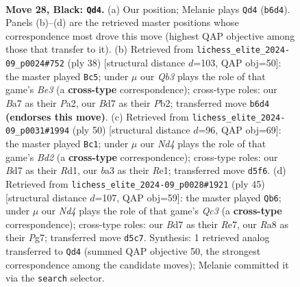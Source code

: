 \documentclass[11pt]{article}
\begin{document}
\clearpage

\begin{figure}[p]\centering
\begin{subfigure}{0.46\textwidth}\centering
\resizebox{\linewidth}{!}{%
\newchessgame
\chessboard[
  setfen={r3r2k/bp1b1pp1/pq2p3/3n3P/8/BP1p1Q1B/P2P1PKP/RN2R3 b - - 1 28},
  showmover=false,
  pgfstyle=straightmove, color=movearrow, markmove={b6-d4}
]}
\caption{}
\end{subfigure}\hfill
\begin{subfigure}{0.46\textwidth}\centering
\resizebox{\linewidth}{!}{%
\newchessgame
\chessboard[
  setfen={r1b1r3/2p1P1bk/p1p3np/5p2/6pq/2N1B3/PP1Q1PPN/R3R1K1 w - - 1 20},
  showmover=false,
  pgfstyle=straightmove, color=movearrow, markmove={e3-c5}
]}
\caption{}
\end{subfigure}
\\[4pt]
\begin{subfigure}{0.46\textwidth}\centering
\resizebox{\linewidth}{!}{%
\newchessgame
\chessboard[
  setfen={b2qk3/2p1bpr1/4pn2/p3Np1p/3P4/2P2P1Q/Pr1B2PP/3RRBK1 w - - 0 26},
  showmover=false,
  pgfstyle=straightmove, color=movearrow, markmove={d2-c1}
]}
\caption{}
\end{subfigure}\hfill
\begin{subfigure}{0.46\textwidth}\centering
\resizebox{\linewidth}{!}{%
\newchessgame
\chessboard[
  setfen={6k1/1b2r1p1/p1q1pr2/1p3nNp/1P1b4/PB5Q/2R2PPP/2B2RK1 b - - 3 23},
  showmover=false,
  pgfstyle=straightmove, color=movearrow, markmove={c6-b6}
]}
\caption{}
\end{subfigure}
\caption{\textbf{Move 28, Black: \texttt{Qd4}.} (a) Our position; Melanie plays \texttt{Qd4} (\texttt{b6d4}). Panels (b)--(d) are the retrieved master positions whose correspondence most drove this move (highest QAP objective among those that transfer to it). (b) Retrieved from \texttt{lichess\_elite\_2024-09\_p0024\#752} (ply 38) [structural distance $d$=103, QAP obj=50]: the master played \texttt{Bc5}; under $\mu$ our \emph{Qb3} plays the role of that game's \emph{Be3} (a \textbf{cross-type} correspondence); cross-type roles: our \emph{B}a7 as their \emph{P}a2, our \emph{B}d7 as their \emph{P}b2; transferred move \texttt{b6d4} \textbf{(endorses this move)}. (c) Retrieved from \texttt{lichess\_elite\_2024-09\_p0031\#1994} (ply 50) [structural distance $d$=96, QAP obj=69]: the master played \texttt{Bc1}; under $\mu$ our \emph{Nd4} plays the role of that game's \emph{Bd2} (a \textbf{cross-type} correspondence); cross-type roles: our \emph{B}d7 as their \emph{R}d1, our \emph{b}a3 as their \emph{R}e1; transferred move \texttt{d5f6}. (d) Retrieved from \texttt{lichess\_elite\_2024-09\_p0028\#1921} (ply 45) [structural distance $d$=107, QAP obj=59]: the master played \texttt{Qb6}; under $\mu$ our \emph{Nd4} plays the role of that game's \emph{Qc3} (a \textbf{cross-type} correspondence); cross-type roles: our \emph{B}d7 as their \emph{R}e7, our \emph{R}a8 as their \emph{P}g7; transferred move \texttt{d5c7}. Synthesis: 1 retrieved analog transferred to \texttt{Qd4} (summed QAP objective 50, the strongest correspondence among the candidate moves); Melanie committed it via the \texttt{search} selector.}
\label{fig:thought-m55}
\end{figure}
\end{document}
